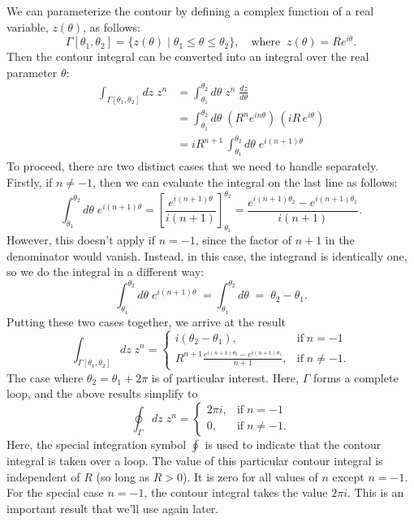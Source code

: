 \documentclass[10pt,a4paper]{article}
\begin{document}
We can parameterize the contour by defining a complex function of a
real variable, $z(\theta)$, as follows:
\begin{equation}
\Gamma[\theta_1,\theta_2] = \big\{z(\theta) \;\big|\; \theta_1 \le \theta \le \theta_2\big\}, \quad \mathrm{where}\;\; z(\theta) = R e^{i\theta}.
\end{equation}
Then the contour integral can be converted into an integral over the
real parameter $\theta$:
\begin{align}
  \int_{\Gamma[\theta_1,\theta_2]} dz\; z^n &= \int_{\theta_1}^{\theta_2}  d\theta \; z^n \; \frac{dz}{d\theta} \\ &= \int_{\theta_1}^{\theta_2}  d\theta \; \left( R^ne^{in\theta}\right)\, \left(iR\, e^{i\theta}\right) \\ &= i R^{n+1} \, \int_{\theta_1}^{\theta_2}  d\theta \; e^{i(n+1)\theta}
\end{align}
To proceed, there are two distinct cases that we need to handle
separately. Firstly, if $n \ne -1$, then we can evaluate the integral
on the last line as follows:
\begin{equation}
\int_{\theta_1}^{\theta_2} d\theta \; e^{i(n+1)\theta} = \left[\frac{e^{i(n+1)\theta}}{i(n+1)}\right]_{\theta_1}^{\theta_2} = \frac{e^{i(n+1)\theta_2} - e^{i(n+1)\theta_1}}{i(n+1)}.
\end{equation}
However, this doesn't apply if $n = -1$, since the factor of $n + 1$
in the denominator would vanish. Instead, in this case, the integrand is
identically one, so we do the integral in a different way:
\begin{equation}
\int_{\theta_1}^{\theta_2} d\theta \; e^{i(n+1)\theta} \; = \int_{\theta_1}^{\theta_2} d\theta \;=\; \theta_2 - \theta_1.
\end{equation}
Putting these two cases together, we arrive at the result
\begin{equation}
\int_{\Gamma[\theta_1,\theta_2]} dz\; z^n = \left\{\begin{array}{ll}i(\theta_2 - \theta_1), & \mathrm{if}\;n = -1 \\ \displaystyle R^{n+1}\frac{e^{i(n+1)\theta_2} - e^{i(n+1)\theta_1}}{n+1},&\mathrm{if}\;n\ne -1.\end{array}\right.
\end{equation}
The case where $\theta_2 = \theta_1 + 2\pi$ is of particular interest.
Here, $\Gamma$ forms a complete loop, and the above results simplify
to
\begin{equation}
\oint_{\Gamma} dz\; z^n = \left\{\begin{array}{ll}2\pi i, & \mathrm{if}\;n = -1 \\ \displaystyle 0,&\mathrm{if}\;n\ne -1.\end{array}\right.
\end{equation}
Here, the special integration symbol $\oint$ is used to indicate that
the contour integral is taken over a loop. The value of this particular
contour integral is independent of $R$ (so long as $R > 0$). It is
zero for all values of $n$ except $n = -1$. For the special case
$n = - 1$, the contour integral takes the value $2\pi i$. This is an
important result that we'll use again later.
\end{document}
